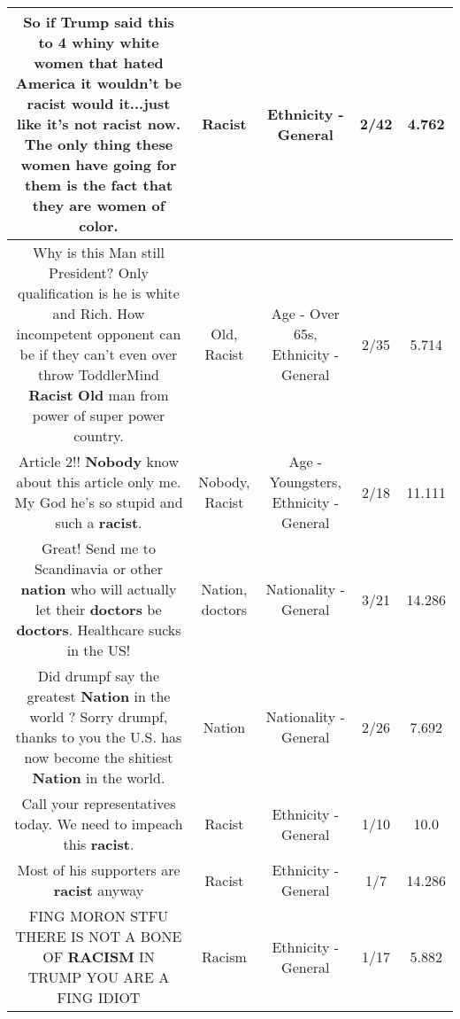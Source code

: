 \documentclass[11pt]{article}
\newlength\mylength
\begin{document}
\begin{center}
\begin{longtable}{|C{.65\mylength}|C{.30\mylength}|C{.12\mylength}|C{.12\mylength}|C{.12\mylength}|}
  \small So if Trump said this to 4 whiny white women that hated America it wouldn't be \textbf{racist} would it...just like it's not \textbf{racist} now. The only thing these women have going for them is the fact that they are women of color.\normalsize   & Racist & Ethnicity - General & 2/42 & 4.762 \\  \hline
  \small Why is this Man still President? Only qualification is he is white and Rich. How incompetent opponent can be if they can't even over throw ToddlerMind \textbf{Racist} \textbf{Old} man from power of super power country.\normalsize   & Old, Racist & Age - Over 65s, Ethnicity - General & 2/35 & 5.714 \\  \hline
  \small Article 2!! \textbf{Nobody} know about this article only me. My God he's so stupid and such a \textbf{racist}.\normalsize   & Nobody, Racist & Age - Youngsters, Ethnicity - General & 2/18 & 11.111 \\  \hline
  \small Great! Send me to Scandinavia or other \textbf{nation} who will actually let their \textbf{doctors} be \textbf{doctors}.  Healthcare sucks in the US!\normalsize   & Nation, doctors & Nationality - General & 3/21 & 14.286 \\  \hline
  \small Did drumpf say the greatest \textbf{Nation} in the world ? Sorry drumpf, thanks to you the U.S. has now become the shitiest \textbf{Nation} in the world.\normalsize   & Nation & Nationality - General & 2/26 & 7.692 \\  \hline
  \small Call your representatives today. We need to impeach this \textbf{racist}.\normalsize   & Racist & Ethnicity - General & 1/10 & 10.0 \\  \hline
  \small Most of his supporters are \textbf{racist} anyway\normalsize   & Racist & Ethnicity - General & 1/7 & 14.286 \\  \hline
  \small FING MORON STFU THERE IS NOT A BONE OF \textbf{RACISM} IN TRUMP YOU ARE A FING IDIOT\normalsize   & Racism & Ethnicity - General & 1/17 & 5.882 \\  \hline

\end{longtable}
\end{center}
\end{document}
